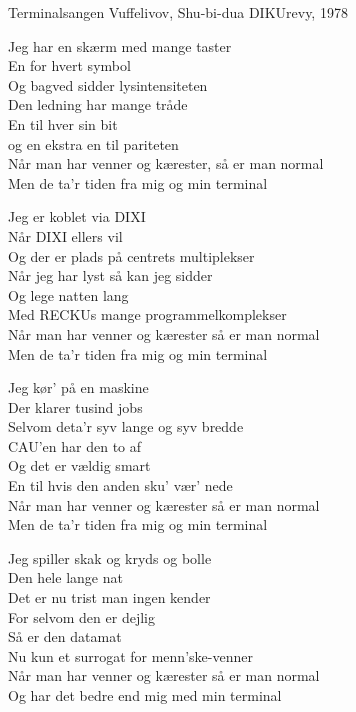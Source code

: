 \begin{song}{Terminalsangen}
  {} %
  {Vuffelivov, Shu-bi-dua} %
  {} %
  {DIKUrevy, 1978} %
  {\NotCCLIed} %

  \begin{SBVerse}
Jeg har en skærm med mange taster\\
En for hvert symbol\\
Og bagved sidder lysintensiteten\\
Den ledning har mange tråde\\
En til hver sin bit\\
og en ekstra en til pariteten\\
Når man har venner og kærester, så er man normal\\
Men de ta'r tiden fra mig og min terminal
  \end{SBVerse}

  \begin{SBVerse}
Jeg er koblet via DIXI\\
Når DIXI ellers vil\\
Og der er plads på centrets multiplekser\\
Når jeg har lyst så kan jeg sidder\\
Og lege natten lang\\
Med RECKUs mange programmelkomplekser\\
Når man har venner og kærester så er man normal\\
Men de ta'r tiden fra mig og min terminal
  \end{SBVerse}

  \begin{SBVerse}
Jeg kør' på en maskine\\
Der klarer tusind jobs\\
Selvom deta'r syv lange og syv bredde\\
CAU'en har den to af\\
Og det er vældig smart\\
En til hvis den anden sku' vær' nede\\
Når man har venner og kærester så er man normal\\
Men de ta'r tiden fra mig og min terminal
  \end{SBVerse}

  \begin{SBVerse}
Jeg spiller skak og kryds og bolle\\
Den hele lange nat\\
Det er nu trist man ingen kender\\
For selvom den er dejlig\\
Så er den datamat\\
Nu kun et surrogat for menn'ske-venner\\
Når man har venner og kærester så er man normal\\
Og har det bedre end mig med min terminal
  \end{SBVerse}
\end{song}